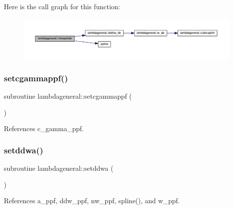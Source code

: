 Here is the call graph for this function\+:
\nopagebreak
\begin{figure}[H]
\begin{center}
\leavevmode
\includegraphics[width=350pt]{namespacelambdageneral_ac5a1ca91bd76eaf1d2f8e05944b798d6_cgraph}
\end{center}
\end{figure}
\mbox{\label{namespacelambdageneral_a2e52a5cb604fe6d314c2bdbfc3d6b723}} 
\subsubsection{\texorpdfstring{setcgammappf()}{setcgammappf()}}
{\footnotesize\ttfamily subroutine lambdageneral\+::setcgammappf (\begin{DoxyParamCaption}{ }\end{DoxyParamCaption})}



References c\+\_\+gamma\+\_\+ppf.

\mbox{\label{namespacelambdageneral_ad21de3de68d0d0e75156e818dd8b49e1}} 
\subsubsection{\texorpdfstring{setddwa()}{setddwa()}}
{\footnotesize\ttfamily subroutine lambdageneral\+::setddwa (\begin{DoxyParamCaption}{ }\end{DoxyParamCaption})}



References a\+\_\+ppf, ddw\+\_\+ppf, nw\+\_\+ppf, spline(), and w\+\_\+ppf.


